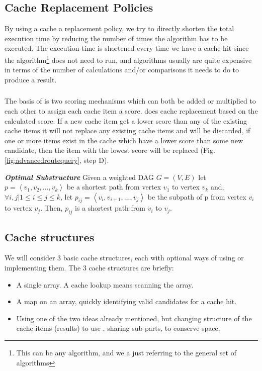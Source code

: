 \subsection{Cache Replacement Policies}

By using a cache a replacement policy, we try to directly shorten the total execution time by reducing the number of times the \spath algorithm has to be executed. 
The execution time is shortened every time we have a cache hit since the \spath algorithm\footnote{This can be any \spath algorithm, and we a just referring to the general set of \spath algorithms} does not need to run, and \spath algorithms usually are quite expensive in terms of the number of calculations and/or comparisons it needs to do to produce a result.


\subsubsection{\osc}

The basis of \osc is two scoring mechanisms which can both be added or multiplied to each other to assign each cache item a score. \osc does cache replacement based on the calculated score. If a new cache item get a lower score than any of the existing cache items it will not replace any existing cache items and will be discarded, if one or more items exist in the cache which have a lower score than some new candidate, then the item with the lowest score will be replaced (Fig. \ref{fig:advancedroutequery}, step D).

\begin{lemma}{\it \textbf{\spath Optimal Substructure}}
Given a weighted DAG $G = (V, E)$ let $p = \left< v_1, v_2,..., v_k \right>$ be a shortest path from vertex $v_1$ to vertex $v_k$ and, $\forall i,j | 1 \leq i \leq j \leq k$, let $p_{ij} = \left<v_i, v_{i+1},..., v_j \right>$ be the subpath of p from vertex $v_i$ to vertex $v_j$. Then, $p_{ij}$ is a shortest path from $v_i$ to $v_j$.
\end{lemma}



\subsection{Cache structures}

We will consider 3 basic cache structures, each with optional ways of using or implementing them. The 3 cache structures are briefly:
\begin{itemize}
\item A single array. A cache lookup means scanning the array.
\item A map on an array, quickly identifying valid candidates for a cache hit.
\item Using one of the two ideas already mentioned, but changing structure of the cache items (\spath results) to use \spsns, sharing sub-parts, to conserve space.
\end{itemize}

